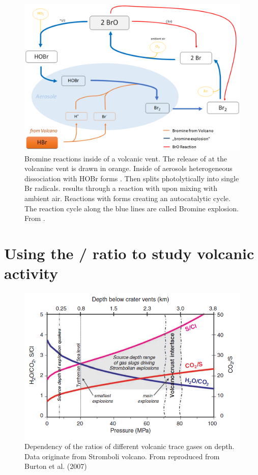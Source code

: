 \documentclass  [
  paper    = a4,
  BCOR     = 10mm,
  twoside,
  fontsize = 12pt,
  fleqn,
  toc      = bibnumbered,
  toc      = listofnumbered,
  numbers  = noendperiod,
  headings = normal,
  listof   = leveldown,
  version  = 3.03
]                                       {scrreprt}
\begin{document}
\begin{figure}
	\centering
	\includegraphics[width=0.7\linewidth]{Bilder/Simon/Bilder_Tung/BrO_Explosion}
	\caption{Bromine reactions inside of a volcanic vent. The release of  at the volcaninc vent is drawn  in orange. Inside of aerosols heterogeneous dissociation with HOBr forms . Then  splits photolytically into single Br radicals.   results through a reaction with  upon mixing with ambient air. Reactions with    forms  creating an autocatalytic cycle. The reaction cycle along the blue lines are called Bromine explosion. From \cite{WarnachSimon}.}
	\label{fig:broexplosion}
\end{figure}

\section{Using the /  ratio to study volcanic activity}
\begin{figure}
	\centering
	\includegraphics[width=0.9\linewidth]{Zwischenbericht2018/Bilder/so2_bro}
	\caption{Dependency of the ratios of different volcanic trace gases on depth. Data originate from Stromboli volcano. From \cite{lubcke2014optical} reproduced from Burton et al. (2007)}
	\label{fig:so2bro}
\end{figure}    
	
\end{document}
